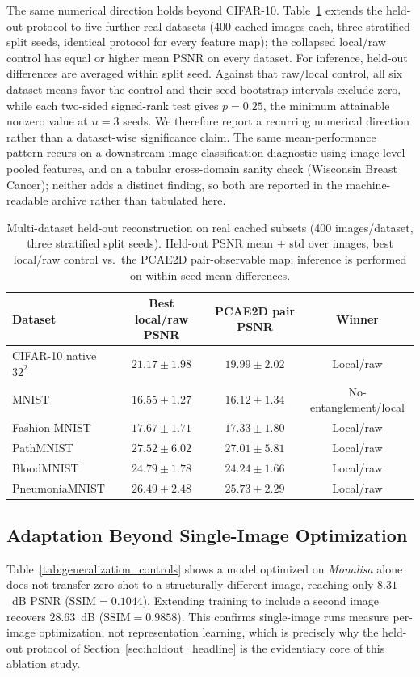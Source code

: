 \documentclass[11pt]{article}
\begin{document}
The same numerical direction holds beyond CIFAR-10. Table~\ref{tab:multi_dataset_reconstruction} extends the held-out protocol to five further real datasets (400 cached images each, three stratified split seeds, identical protocol for every feature map); the collapsed local/raw control has equal or higher mean PSNR on every dataset. For inference, held-out differences are averaged within split seed. Against that raw/local control, all six dataset means favor the control and their seed-bootstrap intervals exclude zero, while each two-sided signed-rank test gives $p=0.25$, the minimum attainable nonzero value at $n=3$ seeds. We therefore report a recurring numerical direction rather than a dataset-wise significance claim. The same mean-performance pattern recurs on a downstream image-classification diagnostic using image-level pooled features, and on a tabular cross-domain sanity check (Wisconsin Breast Cancer); neither adds a distinct finding, so both are reported in the machine-readable archive rather than tabulated here.

\begin{table}[H]
\centering
\caption{Multi-dataset held-out reconstruction on real cached subsets (400 images/dataset, three stratified split seeds). Held-out PSNR mean $\pm$ std over images, best local/raw control vs.\ the PCAE2D pair-observable map; inference is performed on within-seed mean differences.}
\label{tab:multi_dataset_reconstruction}
\scriptsize
\begin{tabular}{lccc}
\toprule
Dataset & Best local/raw PSNR & PCAE2D pair PSNR & Winner \\
\midrule
CIFAR-10 native $32^2$ & $21.17{\pm}1.98$ & $19.99{\pm}2.02$ & Local/raw \\
MNIST & $16.55{\pm}1.27$ & $16.12{\pm}1.34$ & No-entanglement/local \\
Fashion-MNIST & $17.67{\pm}1.71$ & $17.33{\pm}1.80$ & Local/raw \\
PathMNIST & $27.52{\pm}6.02$ & $27.01{\pm}5.81$ & Local/raw \\
BloodMNIST & $24.79{\pm}1.78$ & $24.24{\pm}1.66$ & Local/raw \\
PneumoniaMNIST & $26.49{\pm}2.48$ & $25.73{\pm}2.29$ & Local/raw \\
\bottomrule
\end{tabular}
\end{table}

\subsection{Adaptation Beyond Single-Image Optimization}
Table~\ref{tab:generalization_controls} shows a model optimized on \textit{Monalisa} alone does not transfer zero-shot to a structurally different image, reaching only $8.31$~dB PSNR ($\mathrm{SSIM}=0.1044$). Extending training to include a second image recovers $28.63$~dB ($\mathrm{SSIM}=0.9858$). This confirms single-image runs measure per-image optimization, not representation learning, which is precisely why the held-out protocol of Section~\ref{sec:holdout_headline} is the evidentiary core of this ablation study.
\end{document}

